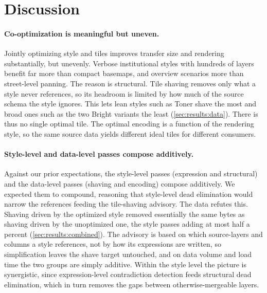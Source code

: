 
\section{Discussion}\label{sec:discussion}

\paragraph*{Co-optimization is meaningful but uneven.}
Jointly optimizing style and tiles improves transfer size and rendering substantially, but unevenly.
Verbose institutional styles with hundreds of layers benefit far more than compact basemaps, and overview scenarios more than street-level panning.
The reason is structural.
Tile shaving removes only what a style never references, so its headroom is limited by how much of the source schema the style ignores.
This lets lean styles such as Toner shave the most and broad ones such as the two Bright variants the least (\cref{sec:results:data}).
There is thus no single optimal tile.
The optimal encoding is a function of the rendering style, so the same source data yields different ideal tiles for different consumers.

\paragraph*{Style-level and data-level passes compose additively.}
Against our prior expectations, the style-level passes (expression and structural) and the data-level passes (shaving and encoding) compose additively.
We expected them to compound, reasoning that style-level dead elimination would narrow the references feeding the tile-shaving advisory.
The data refutes this.
Shaving driven by the optimized style removed essentially the same bytes as shaving driven by the unoptimized one, the style passes adding at most half a percent (\cref{sec:results:combined}).
The advisory is based on which source-layers and columns a style references, not by how its expressions are written, so simplification leaves the shave target untouched, and on data volume and load time the two groups are simply additive.
Within the style level the picture is synergistic, since expression-level contradiction detection feeds structural dead elimination, which in turn removes the gaps between otherwise-mergeable layers.

